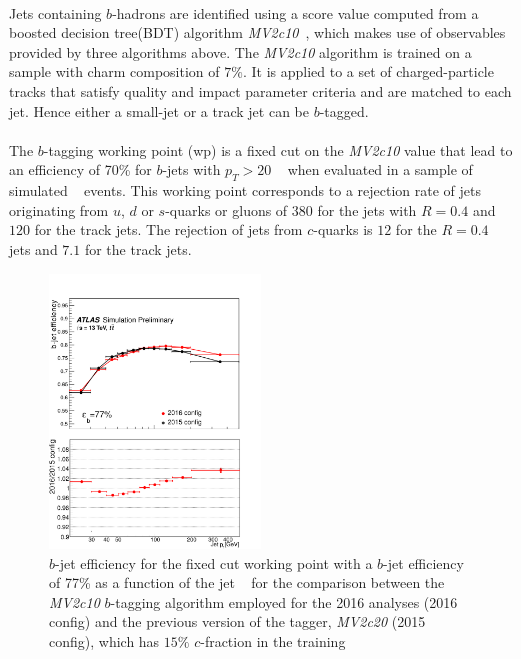 \paragraph{}
Jets containing $b$-hadrons are identified using a score value computed from a boosted decision tree(BDT) algorithm \emph{MV2c10}~\cite{btaggingRun2, Aad:2015ydr}, which makes use of observables provided by three algorithms above. The \emph{MV2c10} algorithm is trained on a sample with charm composition of $7\%$. It is applied to a set of charged-particle tracks that satisfy quality and impact parameter criteria and are matched to each jet. Hence either a small-\R jet or a track jet can be $b$-tagged.

\paragraph{}
The $b$-tagging working point (wp) is a fixed cut on the \emph{MV2c10} value that lead to an efficiency of 70\% for $b$-jets with $p_T > 20$ \GeV~ when evaluated in a sample of simulated \ttbar~ events. This working point corresponds to a rejection rate of jets originating from $u$, $d$ or $s$-quarks or gluons of $380$ for the jets with $R=0.4$ and $120$ for the track jets. The rejection of jets from $c$-quarks is $12$ for the $R=0.4$ jets and $7.1$ for the track jets.

\begin{figure}[h!]
  \centering
  \captionsetup{justification=centering}
  \includegraphics[width=0.5\textwidth]{figures/object/b_eff_pt}
   \caption{$b$-jet efficiency for the fixed cut working point with a $b$-jet efficiency of 77\% as a function of the jet \pt~ for the comparison between the \emph{MV2c10} $b$-tagging algorithm employed for the 2016 analyses (2016 config) and the previous version of the tagger, \emph{MV2c20} (2015 config), which has $15\%$ $c$-fraction in the training}
  \label{fig:obj_b_eff}
\end{figure}

